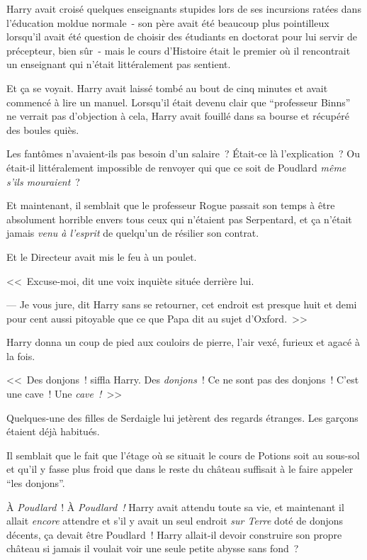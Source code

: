 Harry avait croisé quelques enseignants stupides lors de ses incursions ratées dans l'éducation moldue normale~- son père avait été beaucoup plus pointilleux lorsqu'il avait été question de choisir des étudiants en doctorat pour lui servir de précepteur, bien sûr~- mais le cours d'Histoire était le premier où il rencontrait un enseignant qui n'était littéralement pas sentient.

Et ça se voyait. Harry avait laissé tombé au bout de cinq minutes et avait commencé à lire un manuel. Lorsqu'il était devenu clair que “professeur Binns” ne verrait pas d'objection à cela, Harry avait fouillé dans sa bourse et récupéré des boules quiès.

Les fantômes n'avaient-ils pas besoin d'un salaire~? Était-ce là l'explication~? Ou était-il littéralement impossible de renvoyer qui que ce soit de Poudlard \emph{même s'ils mouraient}~?

Et maintenant, il semblait que le professeur Rogue passait son temps à être absolument horrible envers tous ceux qui n'étaient pas Serpentard, et ça n'était jamais \emph{venu à l'esprit} de quelqu'un de résilier son contrat.

Et le Directeur avait mis le feu à un poulet.

<<~Excuse-moi, dit une voix inquiète située derrière lui.

--- Je vous jure, dit Harry sans se retourner, cet endroit est presque huit et demi pour cent aussi pitoyable que ce que Papa dit au sujet d'Oxford.~>>

\later

Harry donna un coup de pied aux couloirs de pierre, l'air vexé, furieux et agacé à la fois.

<<~Des donjons~! siffla Harry. Des \emph{donjons}~! Ce ne sont pas des donjons~! C'est une cave~! Une \emph{cave~!}~>>

Quelques-une des filles de Serdaigle lui jetèrent des regards étranges. Les garçons étaient déjà habitués.

Il semblait que le fait que l'étage où se situait le cours de Potions soit au sous-sol et qu'il y fasse plus froid que dans le reste du château suffisait à le faire appeler “les donjons”.

À \emph{Poudlard}~! À \emph{Poudlard~!} Harry avait attendu toute sa vie, et maintenant il allait \emph{encore} attendre et s'il y avait un seul endroit \emph{sur Terre} doté de donjons décents, ça devait être Poudlard~! Harry allait-il devoir construire son propre château si jamais il voulait voir une seule petite abysse sans fond~?

